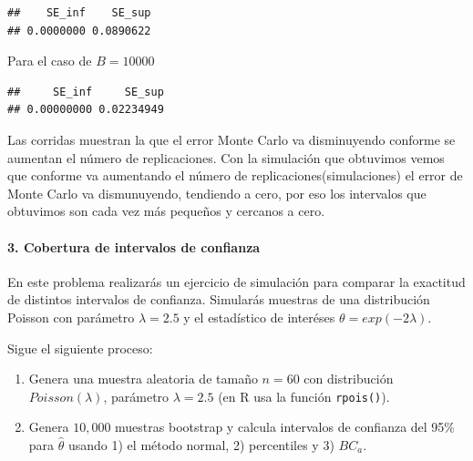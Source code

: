 \documentclass[]{article}
\newenvironment{Shaded}{\begin{snugshade}}{\end{snugshade}}
\newcommand{\DataTypeTok}[1]{\textcolor[rgb]{0.13,0.29,0.53}{#1}}
\newcommand{\DecValTok}[1]{\textcolor[rgb]{0.00,0.00,0.81}{#1}}
\newcommand{\KeywordTok}[1]{\textcolor[rgb]{0.13,0.29,0.53}{\textbf{#1}}}
\newcommand{\NormalTok}[1]{#1}
\newcommand{\OperatorTok}[1]{\textcolor[rgb]{0.81,0.36,0.00}{\textbf{#1}}}
\newcommand{\StringTok}[1]{\textcolor[rgb]{0.31,0.60,0.02}{#1}}
\let\oldparagraph\paragraph
\renewcommand{\paragraph}[1]{\oldparagraph{#1}\mbox{}}
\begin{document}
\begin{verbatim}
##    SE_inf    SE_sup 
## 0.0000000 0.0890622
\end{verbatim}

Para el caso de \(B = 10000\)

\begin{Shaded}
\end{Shaded}

\begin{verbatim}
##     SE_inf     SE_sup 
## 0.00000000 0.02234949
\end{verbatim}

Las corridas muestran la que el error Monte Carlo va disminuyendo
conforme se aumentan el número de replicaciones. Con la simulación que
obtuvimos vemos que conforme va aumentando el número de
replicaciones(simulaciones) el error de Monte Carlo va dismunuyendo,
tendiendo a cero, por eso los intervalos que obtuvimos son cada vez más
pequeños y cercanos a cero.

\hypertarget{cobertura-de-intervalos-de-confianza}{%
\paragraph{3. Cobertura de intervalos de
confianza}\label{cobertura-de-intervalos-de-confianza}}

En este problema realizarás un ejercicio de simulación para comparar la
exactitud de distintos intervalos de confianza. Simularás muestras de
una distribución Poisson con parámetro \(\lambda=2.5\) y el estadístico
de interéses \(\theta=exp(-2\lambda)\).

Sigue el siguiente proceso:

\begin{enumerate}
\def\labelenumi{\roman{enumi})}
\item
  Genera una muestra aleatoria de tamaño \(n=60\) con distribución
  \(Poisson(\lambda)\), parámetro \(\lambda=2.5\) (en R usa la función
  \texttt{rpois()}).
\item
  Genera \(10,000\) muestras bootstrap y calcula intervalos de confianza
  del 95\% para \(\hat{\theta}\) usando 1) el método normal, 2)
  percentiles y 3) \(BC_a\).
\end{enumerate}
\end{document}
